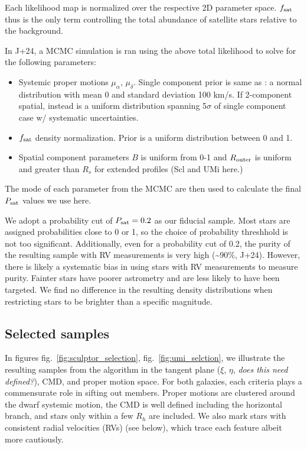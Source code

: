 Each likelihood map is normalized over the respective 2D parameter
space. \(f_{\rm sat}\) thus is the only term controlling the total
abundance of satellite stars relative to the background.

In J+24, a MCMC simulation is ran using the above total likelihood to
solve for the following parameters:

\begin{itemize}
\tightlist
\item
  Systemic proper motions \(\mu_\alpha\), \(\mu_\delta\). Single
  component prior is same as \citet{MV2020}: a normal distribution with
  mean 0 and standard deviation 100 km/s. If 2-component spatial,
  instead is a uniform distribution spanning 5\(\sigma\) of single
  component case w/ systematic uncertainties.
\item
  \(f_{\rm sat}\) density normalization. Prior is a uniform distribution
  between 0 and 1.
\item
  Spatial component parameters \(B\) is uniform from 0-1 and
  \(R_{\rm outer}\) is uniform and greater than \(R_s\) for extended
  profiles (Scl and UMi here.)
\end{itemize}

The mode of each parameter from the MCMC are then used to calculate the
final \(P_{\rm sat}\) values we use here.

We adopt a probability cut of \(P_{\rm sat} = 0.2\) as our fiducial
sample. Most stars are assigned probabilities close to 0 or 1, so the
choice of probability threshhold is not too significant. Additionally,
even for a probability cut of 0.2, the purity of the resulting sample
with RV measurements is very high (\textasciitilde90\%, J+24). However,
there is likely a systematic bias in using stars with RV measurements to
measure purity. Fainter stars have poorer astrometry and are less likely
to have been targeted. We find no difference in the resulting density
distributions when restricting stars to be brighter than a specific
magnitude.

\subsection{Selected samples}\label{selected-samples}

In figures fig.~\ref{fig:sculptor_selection},
fig.~\ref{fig:umi_selction}, we illustrate the resulting samples from
the algorithm in the tangent plane (\(\xi\), \(\eta\), \emph{does this
need defined?}), CMD, and proper motion space. For both galaxies, each
criteria plays a commensurate role in sifting out members. Proper
motions are clustered around the dwarf systemic motion, the CMD is well
defined including the horizontal branch, and stars only within a few
\(R_h\) are included. We also mark stars with consistent radial
velocities (RVs) (see below), which trace each feature albeit more
cautiously.

